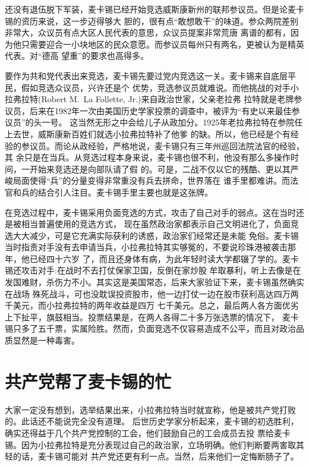 \documentclass[10pt]{article}
\begin{document}
{还没有退伍脱下军装，麦卡锡已经开始竞选威斯康新州的联邦参议员。但是论麦卡锡的资历来说，这一步迈得够大
胆的，很有点``敢想敢干''的味道。参众两院差别非常大，众议员有点大区人民代表的意思，众议员提案非常荒唐
离谱的都有，因为他只需要迎合一小块地区的民众意愿。而参议员每州只有两名，更被认为是精英代表。对``德高
望重''的要求也高得多。

要作为共和党代表出来竞选，麦卡锡先要过党内竞选这一关。麦卡锡来自底层平民，假如竞选众议员，兴许还是个
优势，竞选参议员就难说。而他挑战的对手小拉弗拉特(Robert M.~La Follette, Jr.)来自政治世家，父亲老拉弗
拉特就是老牌参议员，后来在1982年一次由美国历史学家投票的调查中，被评为``有史以来最佳参议员''的头一号。
这当然无形之中会给儿子从政加分。1925年老拉弗拉特在参院任上去世，威斯康新百姓们就选小拉弗拉特补了他爹
的缺。所以，他已经是个有经验的参议员。而论从政经验，严格地说，麦卡锡只有三年州巡回法院法官的经验，其
余只是在当兵。从竞选过程本身来说，麦卡锡也很不利，他没有那么多操作时间，一开始来竞选还是向部队请了假
的。可是，二战不仅以它的残酷、更以其严峻局面使得``兵''的分量变得非常重\myrule 没有兵去拼命，世界落在
谁手里都难讲。而法官和兵的结合引人注目。麦卡锡手里主要也就是这张牌。

在竞选过程中，麦卡锡采用负面竞选的方式，攻击了自己对手的弱点。这在当时还是被相当普遍使用的竞选方式，
现在虽然政治家都表示自己文明进化了，负面竞选大大减少，可是它充满实际获利的诱惑，政治家们经常还是未能
免俗。麦卡锡当时指责对手没有去申请当兵，小拉弗拉特其实够冤的，不要说珍珠港被袭击那年，他已经四十六岁
了，而且还身体有病，为此年轻时读大学都辍了学的。麦卡锡还攻击对手:在战时不去打仗保家卫国，反倒在家炒股
牟取暴利，听上去像是在发国难财，杀伤力不小。其实这是美国常态，后来大家验证下来，麦卡锡虽然确实在战场
殊死战斗，可也没耽误投资股市，他一边打仗一边在股市获利高达四万两千美元，而小拉弗拉特的两年收益是四万
七千美元。总之，最后两人各方面优劣上下扯平，旗鼓相当。投票结果是，在两人各得二十多万张选票的情况下，
麦卡锡只多了五千票，实属险胜。然而，负面竞选不仅容易造成不公平，而且对政治品质显然是一种毒害。

\pagebreak
\section{共产党帮了麦卡锡的忙}

大家一定没有想到，选举结果出来，小拉弗拉特当时就宣称，他是被共产党打败的。此话还不能说完全没有道理。
后世历史学家分析起来，麦卡锡的初选胜利，确实还得益于几个共产党控制的工会，他们鼓励自己的工会成员去投
票给麦卡锡。因为小拉弗拉特是充分表现过自己的政治家，立场明确。他们判断要两害取其轻的话，麦卡锡可能对
共产党还更有利一点。当然，后来他们一定悔断肠子了。

}
\end{document}
